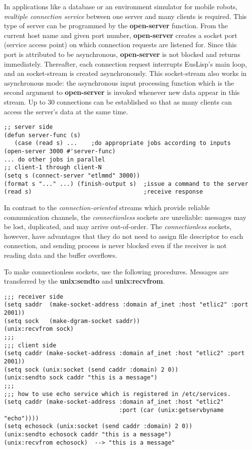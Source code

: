 In applications like a database or an environment simulator for mobile
robots, {\em multiple connection service}
between one server and many clients is required.
This type of server can be programmed by the {\bf open-server} function.
From the current host name and given port number,
{\bf open-server} creates a socket port (service access point)
on which connection requests are listened for.
Since this port is attributed to be asynchronous,
{\bf open-server} is not blocked and returns immediately.
Thereafter, each connection request interrupts EusLisp's main loop,
and an socket-stream is created asynchronously.
This socket-stream also works in asynchronous mode:
the asynchronous input processing function which is the second argument
to {\bf open-server} is invoked whenever new data appear in this stream.
Up to 30 connections can be established so that
as many clients can access the server's data at the same time.

\begin{verbatim}
;; server side
(defun server-func (s) 
   (case (read s) ...    ;do appropriate jobs according to inputs
(open-server 3000 #'server-func)
... do other jobs in parallel
;; client-1 through client-N
(setq s (connect-server "etlmmd" 3000))
(format s "..." ...) (finish-output s)	;issue a command to the server
(read s)                                ;receive response
\end{verbatim}

In contrast to the {\it connection-oriented} streams which provide reliable
communication channels,
the {\it connectionless} sockets are unreliable: messages may be lost,
duplicated, and may arrive out-of-order.
The {\it connectionless} sockets, however, have advantages that they
do not need to assign file descriptor to each connection,
and sending process is never blocked even if the receiver is not
reading data and the buffer overflows.

To make connectionless sockets, use the following procedures.
Messages are transferred by the {\bf unix:sendto} and {\bf unix:recvfrom}.
\begin{verbatim}
;;; receiver side
(setq saddr  (make-socket-address :domain af_inet :host "etlic2" :port 2001))
(setq sock   (make-dgram-socket saddr))
(unix:recvfrom sock)
;;;
;;; client side
(setq caddr (make-socket-address :domain af_inet :host "etlic2" :port 2001))
(setq sock (unix:socket (send caddr :domain) 2 0))
(unix:sendto sock caddr "this is a message")
;;;
;;; how to use echo service which is registered in /etc/services.
(setq caddr (make-socket-address :domain af_inet :host "etlic2"
                                 :port (car (unix:getservbyname "echo"))))
(setq echosock (unix:socket (send caddr :domain) 2 0))
(unix:sendto echosock caddr "this is a message")
(unix:recvfrom echosock)  --> "this is a message"
\end{verbatim}


